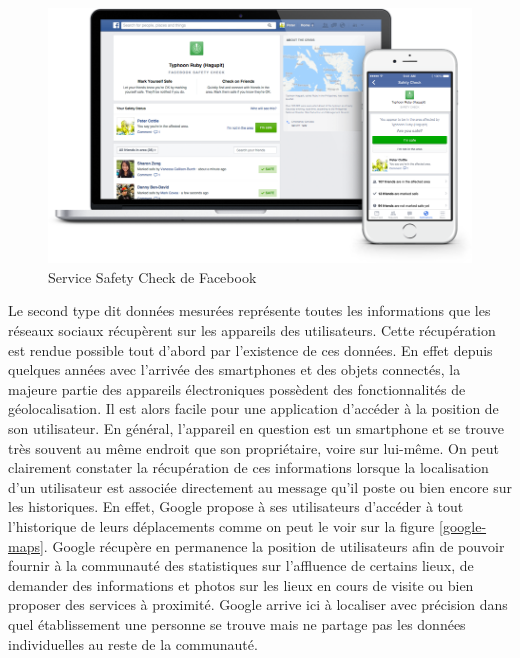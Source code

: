 \begin{figure}[H]
    \centering
    \includegraphics[width=\textwidth]{./img/safetycheck.png}
    \caption{Service Safety Check de Facebook}
    \label{safety-check}
\end{figure}

Le second type dit données mesurées représente toutes les informations que les réseaux sociaux récupèrent sur les appareils des utilisateurs. Cette récupération est rendue possible tout d’abord par l’existence de ces données. En effet depuis quelques années avec l’arrivée des smartphones et des objets connectés, la majeure partie des appareils électroniques possèdent des fonctionnalités de géolocalisation. Il est alors facile pour une application d’accéder à la position de son utilisateur. En général, l’appareil en question est un smartphone et se trouve très souvent au même endroit que son propriétaire, voire sur lui-même. On peut clairement constater la récupération de ces informations lorsque la localisation d’un utilisateur est associée directement au message qu’il poste ou bien encore sur les historiques. En effet, Google propose à ses utilisateurs d’accéder à tout l’historique de leurs déplacements \cite{bibgoogle} comme on peut le voir sur la figure \ref{google-maps}. Google récupère en permanence la position de utilisateurs afin de pouvoir fournir à la communauté des statistiques sur l’affluence de certains lieux, de demander des informations et photos sur les lieux en cours de visite ou bien proposer des services à proximité. Google arrive ici à localiser avec précision dans quel établissement une personne se trouve mais ne partage pas les données individuelles au reste de la communauté.

